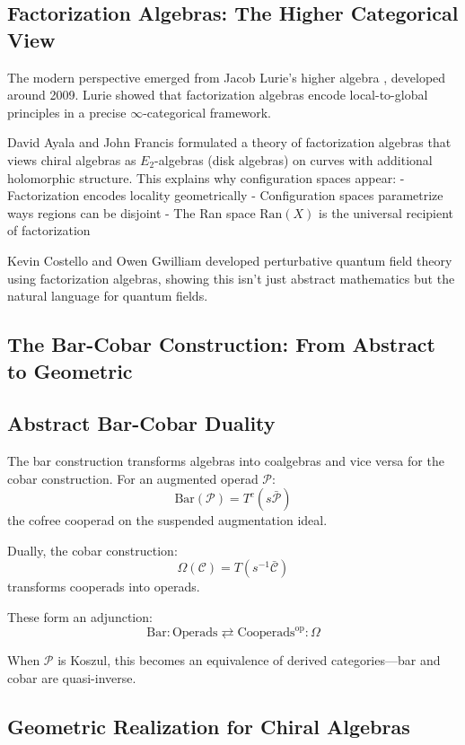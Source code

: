 \subsection{Factorization Algebras: The Higher Categorical View}

The modern perspective emerged from Jacob Lurie's higher algebra \cite{HA}, developed around 2009. Lurie showed that factorization algebras encode local-to-global principles in a precise $\infty$-categorical framework.

David Ayala and John Francis \cite{AF15} formulated a theory of factorization algebras that views chiral algebras as $E_2$-algebras (disk algebras) on curves with additional holomorphic structure. This explains why configuration spaces appear:
- Factorization encodes locality geometrically
- Configuration spaces parametrize ways regions can be disjoint
- The Ran space $\text{Ran}(X)$ is the universal recipient of factorization

Kevin Costello and Owen Gwilliam \cite{CG17} developed perturbative quantum field theory using factorization algebras, showing this isn't just abstract mathematics but the natural language for quantum fields.

\subsection{The Bar-Cobar Construction: From Abstract to Geometric}

\subsection{Abstract Bar-Cobar Duality}

The bar construction transforms algebras into coalgebras and vice versa for the cobar construction. For an augmented operad $\mathcal{P}$:
$$\text{Bar}(\mathcal{P}) = T^c(s\bar{\mathcal{P}})$$
the cofree cooperad on the suspended augmentation ideal.

Dually, the cobar construction:
$$\Omega(\mathcal{C}) = T(s^{-1}\bar{\mathcal{C}})$$
transforms cooperads into operads.

These form an adjunction:
$$\text{Bar}: \text{Operads} \rightleftarrows \text{Cooperads}^{\text{op}} : \Omega$$

When $\mathcal{P}$ is Koszul, this becomes an equivalence of derived categories—bar and cobar are quasi-inverse.

\subsection{Geometric Realization for Chiral Algebras}

